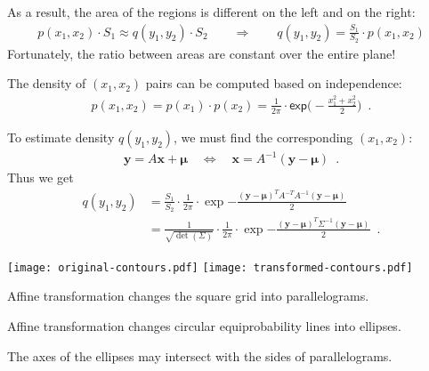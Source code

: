 \documentclass[landscape,footrule]{foils}
\renewcommand{\vec}[1]{\boldsymbol{#1}}
\newcommand{\lastline}{\vspace*{-2ex}}
\begin{document}
As a result, the area of the regions is different on the left and on the right:
\begin{align*}
p(x_1,x_2)\cdot S_1\approx q(y_1,y_2)\cdot S_2\qquad\Longrightarrow\qquad q(y_1,y_2)={\frac{S_1}{S_2}}\cdot p(x_1,x_2) 
\end{align*}
Fortunately, the ratio between areas are constant over the entire plane!\lastline

  

\enlargethispage{1cm}
The density of $(x_1,x_2)$ pairs can be computed based on independence:
\begin{align*}
p(x_1,x_2)=p(x_1)\cdot p(x_2)=\frac{1}{2\pi}\cdot\mathsf{exp}\Biggl(-\frac{x_1^2+x_2^2}{2}\Biggl)\enspace.
\end{align*}
\vspace*{-3ex}

To estimate density $q(y_1,y_2)$, we must find the corresponding $(x_1,x_2)$:
\begin{align*}
 \vec{y}=A\vec{x}+\vec{\mu}\quad\Leftrightarrow\quad \vec{x}=A^{-1}(\vec{y}-\vec{\mu})\enspace. 
\end{align*}
Thus we get \vspace*{-2ex}
\begin{align*}
q(y_1,y_2)&=\frac{S_1}{S_2}\cdot\frac{1}{2\pi}\cdot
\exp{-\frac{(\vec{y}-\vec{\mu})^T A^{-T}A^{-1}(\vec{y}-\vec{\mu})}{2}}\\
&=\frac{1}{\sqrt{\det(\Sigma)}}\cdot\frac{1}{2\pi}\cdot
\exp{-\frac{(\vec{y}-\vec{\mu})^T \Sigma^{-1}(\vec{y}-\vec{\mu})}{2}}\enspace.
\end{align*}

 

 
\begin{center}
\texttt{[image: original-contours.pdf]}
\raisebox{4.0cm}{$\quad\xrightarrow{\vec{y}=A\vec{x}+\vec{\mu}}\quad$}
\texttt{[image: transformed-contours.pdf]}
\end{center}\vspace*{-0cm}

\begin{triangles}
\item Affine transformation changes the square grid into parallelograms. 
\item Affine transformation changes circular equiprobability lines into ellipses. 
\item The axes of the ellipses may intersect with the sides of parallelograms.
\end{triangles}
\end{document}
